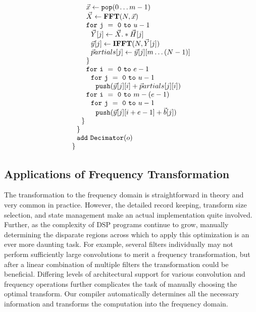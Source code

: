 \begin{transformation}
\begin{equation}
\begin{array}{ll}
    ~~~~~~\vec{x} \leftarrow {\tt pop}(0 \dots m - 1) \\
    ~~~~~~\vec{X} \leftarrow \mathbf{FFT} (N, \vec{x}) \\
    ~~~~~~{\tt for~j~=~0~to~}u-1\\
    ~~~~~~~~\vec{Y}[j] \leftarrow \vec{X} .* \vec{H}[j] \\
    ~~~~~~~~\vec{y}[j] \leftarrow \mathbf{IFFT}(N, \vec{Y}[j]) \\
    ~~~~~~~~{\vec partials}[j] \leftarrow \vec{y}[j][m \dots (N-1)]\\
    ~~~~~~{\tt \}} \\
    ~~~~~~{\tt for~i~=~0~to~}e-1\\
    ~~~~~~~~{\tt for~j~=~0~to~}u-1\\
    ~~~~~~~~~~{\tt push}(\vec{y}[j][i] + {\vec partials}[j][i])\\
    ~~~~~~{\tt for~i~=~0~to~}m-(e-1)\\
    ~~~~~~~~{\tt for~j~=~0~to~}u-1\\
    ~~~~~~~~~~{\tt push}(\vec{y}[j][i+e-1] + {\vec b}[j])\\
    ~~~~{\tt \}} \\
    ~~{\tt \}} \\
    ~~{\tt add~Decimator}(o) \\
    {\tt \}} \\
  \end{array}
\end{equation}
\label{trans:freq1}
\end{transformation}

\subsection{Applications of Frequency Transformation}

The transformation to the frequency domain is straightforward in
theory and very common in practice. However, the detailed record
keeping, transform size selection, and state management make an actual
implementation quite involved.  Further, as the complexity of DSP
programs continue to grow, manually determining the disparate regions
across which to apply this optimization is an ever more daunting task.
For example, several filters individually may not perform sufficiently
large convolutions to merit a frequency transformation, but after a
linear combination of multiple filters the transformation could be
beneficial.  Differing levels of architectural support for various
convolution and frequency operations further complicates the task of
manually choosing the optimal transform.  Our compiler automatically
determines all the necessary information and transforms the
computation into the frequency domain.

